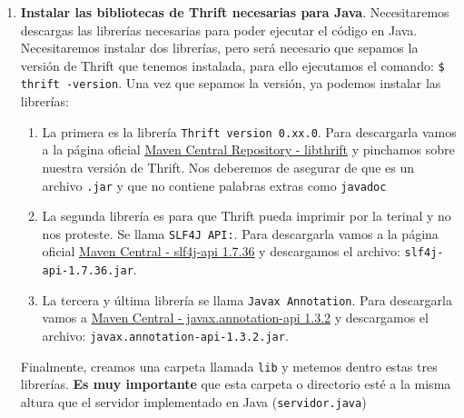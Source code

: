 \documentclass[a4paper,12pt]{article}
\begin{document}
\begin{enumerate}
\begin{enumerate}
						\item  Ahora ya podemos \textbf{instalar los paquetes de Thrift en Python}. Ejecutamos el siguiente comando:
							\begin{center}
							\end{center}
						
						\item  Una vez que se hayan instalado satisfactoriamente, salimos del entorno ejecutando:
							\begin{center}
							\end{center}
							
					\end{enumerate}
					
					\item  \textbf{Instalar las bibliotecas de Thrift necesarias para Java}. Necesitaremos descargas las librerías necesarias para poder ejecutar el código en Java. Necesitaremos instalar dos librerías, pero será necesario que sepamos la versión de Thrift que tenemos instalada, para ello ejecutamos el comando: \texttt{\$ thrift -version}. Una vez que sepamos la versión, ya podemos instalar las librerías:
						\begin{enumerate}
							\item La primera es la librería \texttt{Thrift version 0.xx.0}. Para descargarla vamos a la página oficial \href{https://repo1.maven.org/maven2/org/apache/thrift/libthrift/}{\underline{Maven Central Repository - libthrift}} y pinchamos sobre nuestra versión de Thrift. Nos deberemos de asegurar de que es un archivo \texttt{.jar} y que no contiene palabras extras como \texttt{javadoc}
							
							\item La segunda librería es para que Thrift pueda imprimir por la terinal y no nos proteste. Se llama \texttt{SLF4J API:}. Para descargarla vamos a la página oficial \href{https://repo1.maven.org/maven2/org/slf4j/slf4j-api/1.7.36/}{\underline{Maven Central - slf4j-api 1.7.36}} y descargamos  el archivo: \texttt{slf4j-api-1.7.36.jar}.
							
							\item La tercera y última librería  se llama \texttt{Javax Annotation}. Para descargarla vamos a  \href{https://repo1.maven.org/maven2/org/slf4j/slf4j-api/1.7.36/}{\underline{Maven Central - javax.annotation-api 1.3.2}} y descargamos  el archivo: \texttt{javax.annotation-api-1.3.2.jar}.
						\end{enumerate}
						
					Finalmente, creamos una carpeta llamada \texttt{lib} y metemos dentro estas tres librerías. \textbf{Es muy importante} que esta carpeta o directorio esté a la misma altura que el servidor implementado en Java (\texttt{servidor.java})
			\end{enumerate}
		
\end{document}

